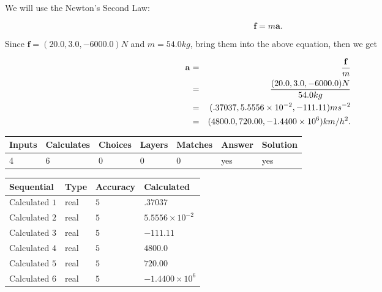 \documentclass[12pt]{article}
\begin{document}
 

We will use the Newton's Second Law:
 
\[
\mathbf{f}=m\mathbf{a}.
\]
 
Since $\mathbf{f}=( %
20.0,  %
3.0,  %
-6000.0 )N$
and $m= %
54.0 kg$, bring them into the above equation, then we get
 
\begin{eqnarray*}
\mathbf{a}&=&\frac{\mathbf{f}}m  \\
&=&\frac{(
20.0 ,
3.0 ,
-6000.0 )N
}{ %
54.0 kg}  \\
&=&(
.37037 ,
5.5556 \times 10^{-2},
-111.11
)ms^{-2} \\
&=&(
4800.0 ,
720.00 ,
-1.4400 \times 10^{6}
)km/h^2.
\end{eqnarray*}
 
 
 
\noindent{}
 
 

 
\vspace{0.3in}
   
   
   
   
\noindent\begin{tabular}{|l|l|l|l|l|l|l|}
 \hline
Inputs & Calculates & Choices & Layers & Matches & Answer & Solution \\ \hline
           4 & 
           6 & 
           0
  & 
           0 & 
           0 & 
  yes & 
  yes 
  \\ \hline
 \end{tabular}
   
   
   
   
\noindent{}
   
   
  
  
\noindent\begin{tabular}{|l|l|l|l|}
\hline
 Sequential & Type & Accuracy & Calculated \\ 
\hline
 
 
  Calculated $           1$ & real & $           5 $ & 
 $ .37037 $ 
 \\  \hline  
 
 
  Calculated $           2$ & real & $           5 $ & 
 $ 5.5556 \times 10^{-2} $ 
 \\  \hline  
 
 
  Calculated $           3$ & real & $           5 $ & 
 $ -111.11 $ 
 \\  \hline  
 
 
  Calculated $           4$ & real & $           5 $ & 
 $ 4800.0 $ 
 \\  \hline  
 
 
  Calculated $           5$ & real & $           5 $ & 
 $ 720.00 $ 
 \\  \hline  
 
 
  Calculated $           6$ & real & $           5 $ & 
 $ -1.4400 \times 10^{6} $ 
 \\  \hline  
 \end{tabular}
   
\end{document}
